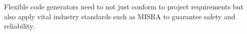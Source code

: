 \begin{tcolorbox}[colback=blue!5, colframe=blue!40!black] Flexible code generators need to not just conform to project requirements but also apply vital industry standards such as MISRA to guarantee safety and reliability. \end{tcolorbox}







